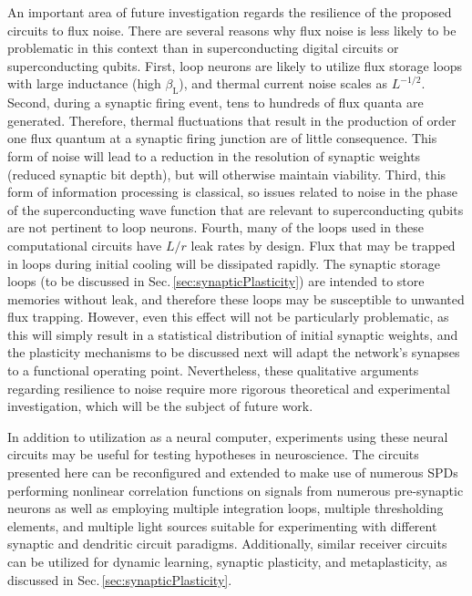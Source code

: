 \documentclass[twocolumn]{article}
\begin{document}
An important area of future investigation regards the resilience of the proposed circuits to flux noise. There are several reasons why flux noise is less likely to be problematic in this context than in superconducting digital circuits or superconducting qubits. First, loop neurons are likely to utilize flux storage loops with large inductance (high $\beta_{\mathrm{L}}$), and thermal current noise scales as $L^{-1/2}$. Second, during a synaptic firing event, tens to hundreds of flux quanta are generated. Therefore, thermal fluctuations that result in the production of order one flux quantum at a synaptic firing junction are of little consequence. This form of noise will lead to a reduction in the resolution of synaptic weights (reduced synaptic bit depth), but will otherwise maintain viability. Third, this form of information processing is classical, so issues related to noise in the phase of the superconducting wave function that are relevant to superconducting qubits are not pertinent to loop neurons. Fourth, many of the loops used in these computational circuits have $L/r$ leak rates by design. Flux that may be trapped in loops during initial cooling will be dissipated rapidly. The synaptic storage loops (to be discussed in Sec.\,\ref{sec:synapticPlasticity}) are intended to store memories without leak, and therefore these loops may be susceptible to unwanted flux trapping. However, even this effect will not be particularly problematic, as this will simply result in a statistical distribution of initial synaptic weights, and the plasticity mechanisms to be discussed next will adapt the network's synapses to a functional operating point. Nevertheless, these qualitative arguments regarding resilience to noise require more rigorous theoretical and experimental investigation, which will be the subject of future work.

In addition to utilization as a neural computer, experiments using these neural circuits may be useful for testing hypotheses in neuroscience. The circuits presented here can be reconfigured and extended to make use of numerous SPDs performing nonlinear correlation functions on signals from numerous pre-synaptic neurons as well as employing multiple integration loops, multiple thresholding elements, and multiple light sources suitable for experimenting with different synaptic and dendritic circuit paradigms. Additionally, similar receiver circuits can be utilized for dynamic learning, synaptic plasticity, and metaplasticity, as discussed in Sec.\,\ref{sec:synapticPlasticity}.
\end{document}
